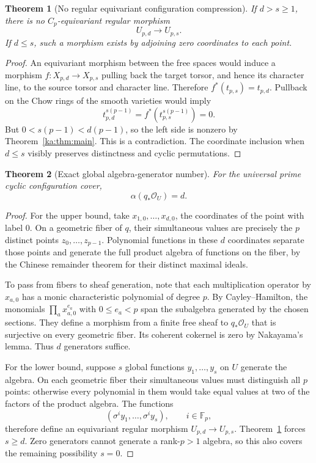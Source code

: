 \documentclass[11pt,a4paper]{article}
\newtheorem{theorem}{Theorem}[section]
\theoremstyle{definition}
\theoremstyle{remark}
\newcommand{\F}{\mathbb F}
\newcommand{\OO}{\mathcal O}
\newcommand{\alggen}{\alpha}
\begin{document}
\begin{theorem}[No regular equivariant configuration compression]
\label{ka:thm:configurationcompression}
If $d>s\geq1$, there is no $C_p$-equivariant regular morphism
\begin{equation}
 U_{p,d}\longrightarrow U_{p,s}.
 \label{ka:eq:compression}
\end{equation}
If $d\leq s$, such a morphism exists by adjoining zero coordinates to
each point.
\end{theorem}
\begin{proof}
An equivariant morphism between the free spaces would induce a morphism
$f:X_{p,d}\to X_{p,s}$ pulling back the target torsor, and hence its
character line, to the source torsor and character line. Therefore
$f^*(t_{p,s})=t_{p,d}$. Pullback on the Chow rings of the smooth varieties
would imply
\[
 t_{p,d}^{s(p-1)}=f^*(t_{p,s}^{s(p-1)})=0.
\]
But $0<s(p-1)<d(p-1)$, so the left side is nonzero by
Theorem~\ref{ka:thm:main}. This is a contradiction. The coordinate inclusion
when $d\leq s$ visibly preserves distinctness and cyclic permutations.
\end{proof}

\begin{theorem}[Exact global algebra-generator number]
\label{ka:thm:alggen}
For the universal prime cyclic configuration cover,
\begin{equation}
 \alggen(q_*\OO_U)=d.
 \label{ka:eq:alggen}
\end{equation}
\end{theorem}
\begin{proof}
For the upper bound, take $x_{1,0},\ldots,x_{d,0}$, the coordinates
of the point with label $0$. On a geometric fiber of $q$, their
simultaneous values are precisely the $p$ distinct points
$z_0,\ldots,z_{p-1}$. Polynomial functions in these $d$ coordinates
separate those points and generate the full product algebra of functions
on the fiber, by the Chinese remainder theorem for their distinct
maximal ideals.

To pass from fibers to sheaf generation, note that each multiplication
operator by $x_{a,0}$ has a monic characteristic polynomial of degree
$p$. By Cayley--Hamilton, the monomials
$\prod_a x_{a,0}^{e_a}$ with $0\leq e_a<p$ span the subalgebra generated
by the chosen sections. They define a morphism from a finite free sheaf
to $q_*\OO_U$ that is surjective on every geometric fiber. Its coherent
cokernel is zero by Nakayama's lemma. Thus $d$ generators suffice.

For the lower bound, suppose $s$ global functions $y_1,\ldots,y_s$ on
$U$ generate the algebra. On each geometric fiber their simultaneous
values must distinguish all $p$ points: otherwise every polynomial in
them would take equal values at two of the factors of the product
algebra. The functions
\[
 (\sigma^i y_1,\ldots,\sigma^i y_s),\qquad i\in\F_p,
\]
therefore define an equivariant regular morphism
$U_{p,d}\to U_{p,s}$. Theorem~\ref{ka:thm:configurationcompression} forces
$s\geq d$. Zero generators cannot generate a rank-$p>1$ algebra, so
this also covers the remaining possibility $s=0$.
\end{proof}
\end{document}
